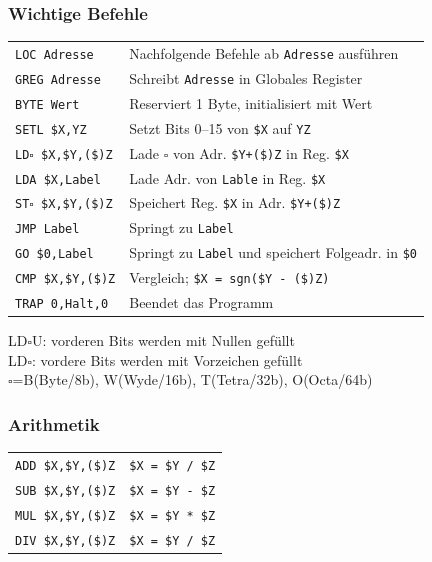 \documentclass[fs]{latex4ei}
\begin{document}
\begin{multicols}{4}
		\subsubsection{Wichtige Befehle}
		\begin{tabular}{ll}
			\texttt{LOC Adresse} & Nachfolgende Befehle ab \texttt{Adresse} ausführen\\
			\texttt{GREG Adresse} & Schreibt \texttt{Adresse} in Globales Register\\
			\texttt{BYTE Wert} & Reserviert 1 Byte, initialisiert mit Wert\\
			\texttt{SETL \$X,YZ} & Setzt Bits 0--15 von \texttt{\$X} auf \texttt{YZ}\\
			\texttt{LD$\square$ \$X,\$Y,(\$)Z} & Lade $\square$ von Adr. \texttt{\$Y+(\$)Z} in Reg. \texttt{\$X} \\
			\texttt{LDA \$X,Label} & Lade Adr. von \texttt{Lable} in Reg. \texttt{\$X}\\
			\texttt{ST$\square$ \$X,\$Y,(\$)Z} & Speichert Reg. \texttt{\$X} in Adr. \texttt{\$Y+(\$)Z}\\ 
			\texttt{JMP Label} & Springt zu \texttt{Label}\\
			\texttt{GO \$0,Label} & Springt zu \texttt{Label} und speichert Folgeadr. in \texttt{\$0}\\
			\texttt{CMP \$X,\$Y,(\$)Z} & Vergleich; \texttt{\$X = sgn(\$Y - (\$)Z)}\\
			\texttt{TRAP 0,Halt,0} & Beendet das Programm\\
		\end{tabular}
	LD$\square$U: vorderen Bits werden mit Nullen gefüllt\\
	LD$\square$: vordere Bits werden mit Vorzeichen gefüllt\\
	$\square$=B(Byte/8b), W(Wyde/16b), T(Tetra/32b), O(Octa/64b)\\

		
		\subsubsection{Arithmetik}
		\begin{tabular}{ll}
			\texttt{ADD \$X,\$Y,(\$)Z} & \texttt{\$X = \$Y / \$Z}\\
			\texttt{SUB \$X,\$Y,(\$)Z} & \texttt{\$X = \$Y - \$Z}\\
			\texttt{MUL \$X,\$Y,(\$)Z} & \texttt{\$X = \$Y * \$Z}\\
			\texttt{DIV \$X,\$Y,(\$)Z} & \texttt{\$X = \$Y / \$Z}\\
		\end{tabular}	
		

\end{multicols}
\end{document}
